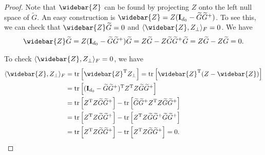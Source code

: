 \documentclass{article}
\newcommand{\T}{\mathrm{T}}
\theoremstyle{plain}
\theoremstyle{definition}
\theoremstyle{remark}
\theoremstyle{remark}
\begin{document}
\begin{proof}
    Note that $\widebar{Z}$ can be found by projecting $Z$ onto the left null space of $\widetilde{G}$. An easy construction is $\widebar{Z} = Z(\mathbf{I}_{d_0}-\widetilde{G} \widetilde{G}^{+})$. To see this, we can check that $\widebar{Z} \widetilde{G} = 0$ and $\langle \widebar{Z}, Z_{\perp} \rangle_F = 0$. We have
    \begin{align}
      \widebar{Z} \widetilde{G} = Z(\mathbf{I}_{d_0}-\widetilde{G} \widetilde{G}^{+}) \widetilde{G} = Z \widetilde{G} - Z \widetilde{G} \widetilde{G}^{+} \widetilde{G} = Z \widetilde{G} - Z \widetilde{G} = 0.
    \end{align}

    To check $\langle \widebar{Z}, Z_{\perp} \rangle_F = 0$, we have
    \begin{align}
      \langle \widebar{Z}, Z_{\perp} \rangle_F &= \operatorname*{tr} \left[ \widebar{Z}^{\T} Z_{\perp} \right] = \operatorname*{tr} \left[\widebar{Z}^{\T} (Z-\widebar{Z}) \right] \nonumber \\
        &= \operatorname*{tr} \left[(\mathbf{I}_{d_0}-\widetilde{G} \widetilde{G}^{+})^{\T} Z^{\T} Z\widetilde{G} \widetilde{G}^{+} \right] \nonumber \\
        &= \operatorname*{tr} \left[Z^{\T} Z\widetilde{G} \widetilde{G}^{+} \right] - \operatorname*{tr} \left[\widetilde{G} \widetilde{G}^{+} Z^{\T} Z\widetilde{G} \widetilde{G}^{+} \right] \nonumber \\
        &= \operatorname*{tr} \left[Z^{\T} Z\widetilde{G} \widetilde{G}^{+} \right] - \operatorname*{tr} \left[Z^{\T} Z\widetilde{G} \widetilde{G}^{+}\widetilde{G} \widetilde{G}^{+} \right] \nonumber \\
        &= \operatorname*{tr} \left[Z^{\T} Z\widetilde{G} \widetilde{G}^{+} \right] - \operatorname*{tr} \left[Z^{\T} Z\widetilde{G} \widetilde{G}^{+} \right] = 0.
    \end{align}
  \end{proof}
  
\end{document}

